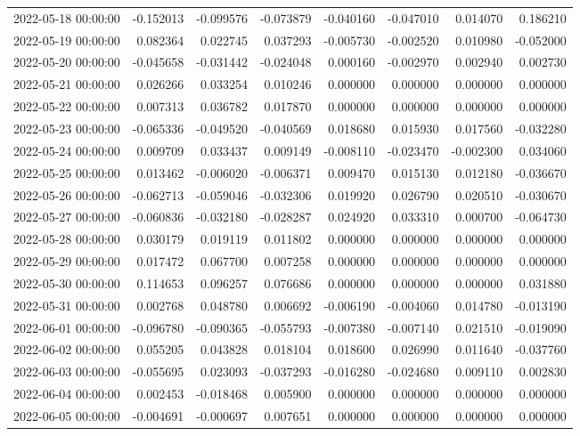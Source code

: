 \begin{tabular}{lrrrrrrr}
2022-05-18 00:00:00 & -0.152013 & -0.099576 & -0.073879 & -0.040160 & -0.047010 & 0.014070 & 0.186210 \\
2022-05-19 00:00:00 & 0.082364 & 0.022745 & 0.037293 & -0.005730 & -0.002520 & 0.010980 & -0.052000 \\
2022-05-20 00:00:00 & -0.045658 & -0.031442 & -0.024048 & 0.000160 & -0.002970 & 0.002940 & 0.002730 \\
2022-05-21 00:00:00 & 0.026266 & 0.033254 & 0.010246 & 0.000000 & 0.000000 & 0.000000 & 0.000000 \\
2022-05-22 00:00:00 & 0.007313 & 0.036782 & 0.017870 & 0.000000 & 0.000000 & 0.000000 & 0.000000 \\
2022-05-23 00:00:00 & -0.065336 & -0.049520 & -0.040569 & 0.018680 & 0.015930 & 0.017560 & -0.032280 \\
2022-05-24 00:00:00 & 0.009709 & 0.033437 & 0.009149 & -0.008110 & -0.023470 & -0.002300 & 0.034060 \\
2022-05-25 00:00:00 & 0.013462 & -0.006020 & -0.006371 & 0.009470 & 0.015130 & 0.012180 & -0.036670 \\
2022-05-26 00:00:00 & -0.062713 & -0.059046 & -0.032306 & 0.019920 & 0.026790 & 0.020510 & -0.030670 \\
2022-05-27 00:00:00 & -0.060836 & -0.032180 & -0.028287 & 0.024920 & 0.033310 & 0.000700 & -0.064730 \\
2022-05-28 00:00:00 & 0.030179 & 0.019119 & 0.011802 & 0.000000 & 0.000000 & 0.000000 & 0.000000 \\
2022-05-29 00:00:00 & 0.017472 & 0.067700 & 0.007258 & 0.000000 & 0.000000 & 0.000000 & 0.000000 \\
2022-05-30 00:00:00 & 0.114653 & 0.096257 & 0.076686 & 0.000000 & 0.000000 & 0.000000 & 0.031880 \\
2022-05-31 00:00:00 & 0.002768 & 0.048780 & 0.006692 & -0.006190 & -0.004060 & 0.014780 & -0.013190 \\
2022-06-01 00:00:00 & -0.096780 & -0.090365 & -0.055793 & -0.007380 & -0.007140 & 0.021510 & -0.019090 \\
2022-06-02 00:00:00 & 0.055205 & 0.043828 & 0.018104 & 0.018600 & 0.026990 & 0.011640 & -0.037760 \\
2022-06-03 00:00:00 & -0.055695 & 0.023093 & -0.037293 & -0.016280 & -0.024680 & 0.009110 & 0.002830 \\
2022-06-04 00:00:00 & 0.002453 & -0.018468 & 0.005900 & 0.000000 & 0.000000 & 0.000000 & 0.000000 \\
2022-06-05 00:00:00 & -0.004691 & -0.000697 & 0.007651 & 0.000000 & 0.000000 & 0.000000 & 0.000000 \\

\end{tabular}
